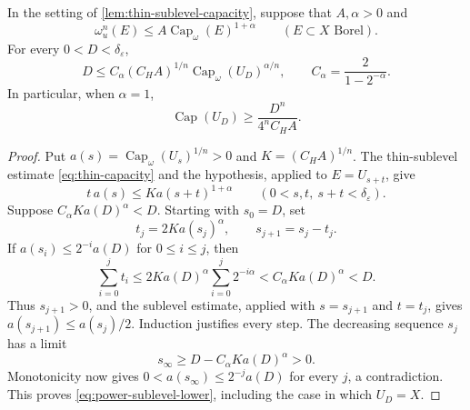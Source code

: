 \begin{lemma}\label{lem:backwards-capacity}\label{lem:power-backwards-capacity}
In the setting of \cref{lem:thin-sublevel-capacity}, suppose that $A,\alpha>0$ and
\[
 \omega_u^n(E)\leq A\operatorname{Cap}_\omega(E)^{1+\alpha}
 \qquad(E\subset X\text{ Borel}).
\]
For every $0<D<\delta_\varepsilon$,
\begin{equation}\label{eq:power-sublevel-lower}
 D\leq C_\alpha(C_HA)^{1/n}
                  \operatorname{Cap}_\omega(U_D)^{\alpha/n},
 \qquad C_\alpha=\frac{2}{1-2^{-\alpha}}.
\end{equation}
In particular, when $\alpha=1$,
\begin{equation}\label{eq:sublevel-capacity-lower}
 \operatorname{Cap}(U_D)\geq\frac{D^n}{4^nC_HA}.
\end{equation}
\end{lemma}
\begin{proof}
Put $a(s)=\operatorname{Cap}_\omega(U_s)^{1/n}>0$ and $K=(C_HA)^{1/n}$. The thin-sublevel estimate \eqref{eq:thin-capacity} and the hypothesis, applied to $E=U_{s+t}$, give
\[
 t\,a(s)\leq K a(s+t)^{1+\alpha}
 \qquad(0<s,t,\ s+t<\delta_\varepsilon).
\]
Suppose $C_\alpha K a(D)^\alpha<D$. Starting with $s_0=D$, set
\[
 t_j=2K a(s_j)^\alpha,\qquad s_{j+1}=s_j-t_j.
\]
If $a(s_i)\leq2^{-i}a(D)$ for $0\leq i\leq j$, then
\[
 \sum_{i=0}^jt_i
 \leq2K a(D)^\alpha\sum_{i=0}^j2^{-i\alpha}
 <C_\alpha K a(D)^\alpha<D.
\]
Thus $s_{j+1}>0$, and the sublevel estimate, applied with $s=s_{j+1}$ and $t=t_j$, gives $a(s_{j+1})\leq a(s_j)/2$. Induction justifies every step. The decreasing sequence $s_j$ has a limit
\[
 s_\infty\geq D-C_\alpha K a(D)^\alpha>0.
\]
Monotonicity now gives $0<a(s_\infty)\leq2^{-j}a(D)$ for every $j$, a contradiction. This proves \eqref{eq:power-sublevel-lower}, including the case in which $U_D=X$.
\end{proof}

